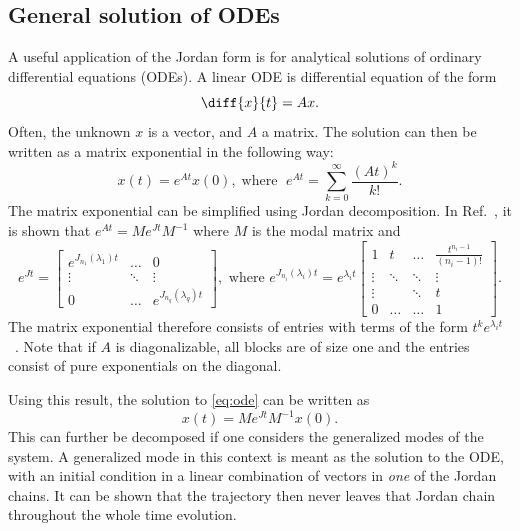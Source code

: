 \documentclass[../main.tex]{subfiles}
\begin{document}
\subsection{General solution of ODEs}
A useful application of the Jordan form is for analytical solutions of ordinary differential equations (ODEs). A linear ODE is differential equation of the form
\begin{equation}\label{eq:ode}
    \diff{x}{t}=Ax. 
\end{equation}
Often, the unknown $x$ is a vector, and $A$ a matrix. The solution can then be written as a matrix exponential in the following way:
\begin{equation}
    x(t) = e^{At}x(0), \;\text{where } \;e^{At} = \sum_{k=0}^{\infty}\frac{(At)^k}{k!}.
\end{equation}
The matrix exponential can be simplified using Jordan decomposition. In Ref.~\cite{uffe}, it is shown that  $e^{At} = Me^{Jt}M^{-1}$ where $M$ is the modal matrix and
\begin{equation}\label{eq:expjordan}
        e^{Jt} = \begin{bmatrix}e^{J_{n_1}(\lambda_1)t} & \dots & 0 \\
                                                         \vdots & \ddots & \vdots \\
                                                         0 & \dots &  e^{J_{n_q}(\lambda_q)t}\end{bmatrix}, \text{ where } 
            e^{J_{n_i}(\lambda_i)t} = e^{\lambda_it} \begin{bmatrix} 1 & t & \dots & \frac{t^{n_i-1}}{(n_i-1)!}\\
                                                                \vdots  & \ddots & \ddots & \vdots \\
                                                                \vdots & & \ddots& t \\
                                                            0 & \dots & \dots & 1\ \end{bmatrix}.
\end{equation}
The matrix exponential therefore consists of entries with terms of the form $t^ke^{\lambda_it}$~\cite{uffe}. Note that if $A$ is diagonalizable, all blocks are of size one and the entries consist of pure exponentials on the diagonal. 

Using this result, the solution to \cref{eq:ode} can be written as 
\begin{equation}\label{jordanode}
    x(t) = Me^{Jt}M^{-1}x(0).
\end{equation}
This can further be decomposed if one considers the generalized modes of the system. A generalized mode in this context is meant as the solution to the ODE, with an initial condition in a linear combination of vectors in \textit{one} of the Jordan chains. It can be shown that the trajectory then never leaves that Jordan chain throughout the whole time evolution.
\end{document}
